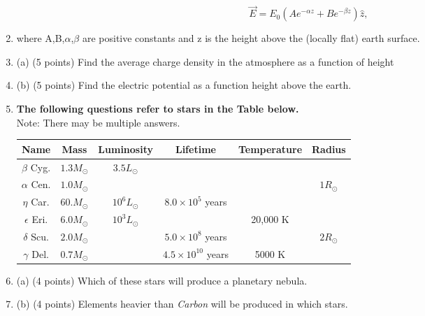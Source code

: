 \documentclass[12pt]{article}
\begin{document}
\begin{enumerate}
\begin{equation}{\overrightarrow{E}=E_{0}(Ae^{-\alpha z}+Be^{-\beta z})\hat{z},}\end{equation}

    \item[\ding{32}]where A,B,$\alpha$,$\beta$ are positive constants and z is the height above the (locally flat) earth surface.
    \item[\ding{32}](a) (5 points) Find the average charge density in the atmosphere as a function of height
    \item[\ding{32}](b) (5 points) Find the electric potential as a function height above the earth. 

    \item {\bf The following questions refer to stars in the Table below.} \\ Note: There may be multiple answers.
    
     \begin{tabular}{|c|c|c|c|c|c|}
        \hline
            Name & Mass & Luminosity & Lifetime & Temperature & Radius\\ \hline
            $\beta$ Cyg. & $1.3 M_{\odot}$ & $3.5 L_{\odot}$ &  &  & \\ \hline
            $\alpha$ Cen. & $1.0 M_{\odot}$ &  &  &  & $1 R_{\odot}$ \\ \hline
            $\eta$ Car. & $60. M_{\odot}$ & $10^6 L_{\odot}$ & $8.0 \times 10^5$ years  &  & \\ \hline
            $\epsilon$ Eri. & $6.0M_{\odot}$ & $10^3 L_{\odot}$ &  & 20,000 K & \\ \hline
            $\delta$ Scu. & $2.0M_{\odot}$ &  & $5.0 \times 10^8$ years &  & $2 R_{\odot}$ \\ \hline
            $\gamma$ Del. & $0.7M_{\odot}$ &  & $4.5 \times 10^{10}$ years & 5000 K & \\ \hline
             
        \end{tabular}

    \item[\ding{32}] (a) (4 points) Which of these stars will produce a planetary nebula.
    \item[\ding{32}] (b) (4 points) Elements heavier than \textit{Carbon} will be produced in which stars.    
\end{enumerate}
\end{document}
